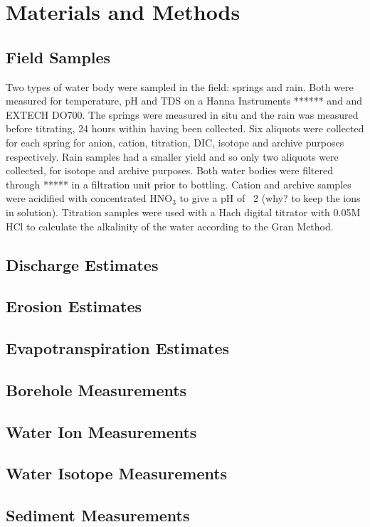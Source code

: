
\section{Materials and Methods}



\subsection{Field Samples}
Two types of water body were sampled in the field: springs and rain. 
Both were measured for temperature, pH and TDS on a Hanna Instruments ****** and  and EXTECH DO700. 
The springs were measured in situ and the rain was measured before titrating, 24 hours within having been collected. 
Six aliquots were collected for each spring for anion, cation, titration, DIC, isotope and archive purposes respectively. 
Rain samples had a smaller yield and so only two aliquots were collected, for isotope and archive purposes. 
Both water bodies were filtered through ***** in a filtration unit prior to bottling. 
Cation and archive samples were acidified with concentrated HNO$_3$ to give a pH of ~2 (why? to keep the ions in solution). 
Titration samples were used with a Hach digital titrator with 0.05M HCl to calculate the alkalinity of the water according to the Gran Method.

\subsection{Discharge Estimates}

\subsection{Erosion Estimates}

\subsection{Evapotranspiration Estimates}

\subsection{Borehole Measurements}

\subsection{Water Ion Measurements}

\subsection{Water Isotope Measurements}

\subsection{Sediment Measurements}
